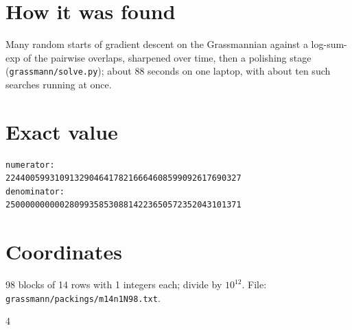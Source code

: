\documentclass[11pt,a4paper]{article}
\begin{document}
\section{How it was found}
Many random starts of gradient descent on the Grassmannian against a log-sum-exp of the pairwise overlaps, sharpened over time, then a polishing stage (\texttt{grassmann/solve.py}); about 88 seconds on one laptop, with about ten such searches running at once.


\appendix
\section{Exact value}
{\small
\begin{verbatim}
numerator:
224400599310913290464178216664608599092617690327
denominator:
250000000000280993585308814223650572352043101371
\end{verbatim}}

\section{Coordinates}
98 blocks of 14 rows with 1 integers each; divide by $10^{12}$. File: \texttt{grassmann/packings/m14n1N98.txt}.
{\tiny
\begin{multicols}{4}
\end{multicols}}
\end{document}
